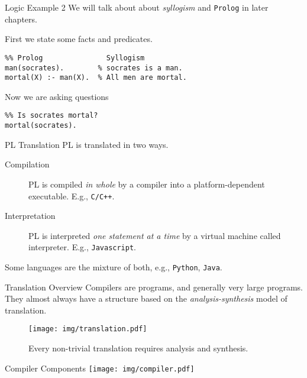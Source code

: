 \documentclass[presentation]{beamer}
\begin{document}
\begin{frame}[fragile,label={sec:orgheadline17}]{Logic Example 2}
 We will talk about about \emph{syllogism} and \texttt{Prolog} in later
chapters.

First we state some facts and predicates.

\begin{verbatim}
%% Prolog               Syllogism
man(socrates).        % socrates is a man.
mortal(X) :- man(X).  % All men are mortal.
\end{verbatim}

Now we are asking questions

\begin{verbatim}
%% Is socrates mortal?
mortal(socrates).
\end{verbatim}
\end{frame}

\begin{frame}[fragile,label={sec:orgheadline18}]{PL Translation}
 PL is translated in two ways.

\begin{description}
\item[{Compilation}] PL is compiled \emph{in whole} by a compiler into a
platform-dependent executable.  E.g., \texttt{C/C++}.
\item[{Interpretation}] PL is interpreted \emph{one statement at a time} by
a virtual machine called interpreter.  E.g., \texttt{Javascript}.
\end{description}


Some languages are the mixture of both, e.g., \texttt{Python}, \texttt{Java}.
\end{frame}

\begin{frame}[label={sec:orgheadline19}]{Translation Overview}
Compilers are programs, and generally very large programs.  They
almost always have a structure based on the \emph{analysis-synthesis}
model of translation.

\begin{figure}[htb]
\centering
\texttt{[image: img/translation.pdf]}
\caption{\label{fig:translation}
Every non-trivial translation requires analysis and synthesis.}
\end{figure}
\end{frame}

\begin{frame}[label={sec:orgheadline20}]{Compiler Components}
\texttt{[image: img/compiler.pdf]}
\end{frame}
\end{document}
